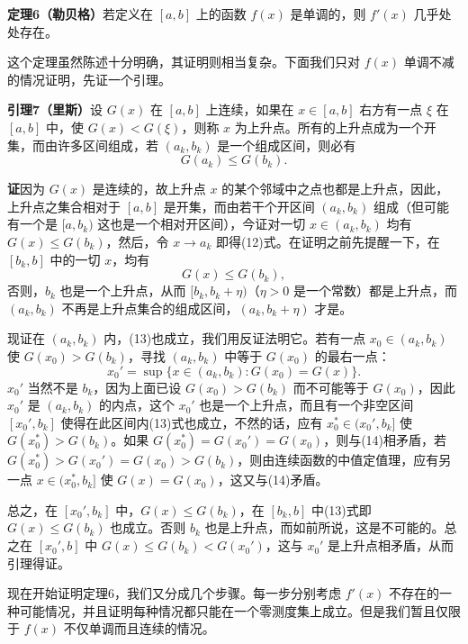 \noindent\textbf{定理6（勒贝格）}\quad 若定义在 $[a,b]$ 上的函数 $f(x)$ 是单调的，则 $f'(x)$ 几乎处处存在。

这个定理虽然陈述十分明确，其证明则相当复杂。下面我们只对 $f(x)$ 单调不减的情况证明，先证一个引理。

\noindent\textbf{引理7（里斯）}\quad 设 $G(x)$ 在 $[a,b]$ 上连续，如果在 $x\in[a,b]$ 右方有一点 $\xi$ 在 $[a,b]$ 中，使 $G(x)<G(\xi)$，则称 $x$ 为上升点。所有的上升点成为一个开集，而由许多区间组成，若 $(a_k,b_k)$ 是一个组成区间，则必有
\begin{equation}
 G(a_k)\le G(b_k).
 \tag{12}
\end{equation}

\noindent\textbf{证}\quad 因为 $G(x)$ 是连续的，故上升点 $x$ 的某个邻域中之点也都是上升点，因此，上升点之集合相对于 $[a,b]$ 是开集，而由若干个开区间 $(a_k,b_k)$ 组成（但可能有一个是 $[a,b_k)$ 这也是一个相对开区间），今证对一切 $x\in(a_k,b_k)$ 均有 $G(x)\le G(b_k)$，然后，令 $x\to a_k$ 即得(12)式。在证明之前先提醒一下，在 $[b_k,b]$ 中的一切 $x$，均有
\begin{equation}
 G(x)\le G(b_k),
 \tag{13}
\end{equation}
否则，$b_k$ 也是一个上升点，从而 $[b_k,b_k+\eta)$（$\eta>0$ 是一个常数）都是上升点，而 $(a_k,b_k)$ 不再是上升点集合的组成区间，$(a_k,b_k+\eta)$ 才是。

现证在 $(a_k,b_k)$ 内，(13)也成立，我们用反证法明它。若有一点 $x_0\in(a_k,b_k)$ 使 $G(x_0)>G(b_k)$，寻找 $(a_k,b_k)$ 中等于 $G(x_0)$ 的最右一点：
\begin{equation}
 x_0'=\sup\{x\in(a_k,b_k):G(x_0)=G(x)\}.
 \tag{14}
\end{equation}
$x_0'$ 当然不是 $b_k$，因为上面已设 $G(x_0)>G(b_k)$ 而不可能等于 $G(x_0)$，因此 $x_0'$ 是 $(a_k,b_k)$ 的内点，这个 $x_0'$ 也是一个上升点，而且有一个非空区间 $[x_0',b_k]$ 使得在此区间内(13)式也成立，不然的话，应有 $x_0^*\in(x_0',b_k]$ 使 $G(x_0^*)>G(b_k)$。如果 $G(x_0^*)=G(x_0')=G(x_0)$，则与(14)相矛盾，若 $G(x_0^*)>G(x_0')=G(x_0)>G(b_k)$，则由连续函数的中值定值理，应有另一点 $x\in(x_0^*,b_k]$ 使 $G(x)=G(x_0)$，这又与(14)矛盾。

总之，在 $[x_0',b_k]$ 中，$G(x)\le G(b_k)$，在 $[b_k,b]$ 中(13)式即 $G(x)\le G(b_k)$ 也成立。否则 $b_k$ 也是上升点，而如前所说，这是不可能的。总之在 $[x_0',b]$ 中 $G(x)\le G(b_k)<G(x_0')$，这与 $x_0'$ 是上升点相矛盾，从而引理得证。

现在开始证明定理6，我们又分成几个步骤。每一步分别考虑 $f'(x)$ 不存在的一种可能情况，并且证明每种情况都只能在一个零测度集上成立。但是我们暂且仅限于 $f(x)$ 不仅单调而且连续的情况。

